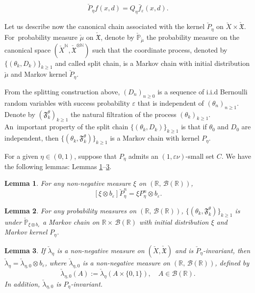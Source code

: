 \documentclass[11pt]{elsarticle}
\newtheorem{lemma}{Lemma}[section]
\def\geq{\geqslant}
\def\P{\mathbb{P}}
\def\N{\mathbb{N}}
\def\R{\mathbb{R}}
\begin{document}
$$\check{P}_\eta f(x,d)=Q_\eta\bar{f}_\varepsilon(x,d).$$

Let us describe now the canonical chain associated with the kernel $\check{P}_\eta$ on $\check{X}\times\check{\mathfrak{X}}$. For~probability measure $\check{\mu}$ on $\check{\mathfrak{X}}$, denote by $\check{\P}_{\check{\mu}}$ the probability measure on the canonical space $\left(\check{X}^{\N},{\check{\mathfrak{X}}}^{\otimes\N}\right)$ such that the coordinate process, denoted by $\{(\theta_k,D_k)\}_{k\geq1}$ and called split chain, is a Markov chain with initial distribution $\check{\mu}$ and Markov kernel $\check{P}_\eta$.

From the splitting construction above, $(D_n)_{n\geq0}$ is a sequence of i.i.d Bernoulli random variables with success probability $\varepsilon$ that is independent of $(\theta_n)_{n\geq1}$. Denote by $\left(\mathfrak{F}_k^\theta\right)_{k\geq1}$ the natural filtration of the process $(\theta_k)_{k\geq1}$. An~important property of the split chain $\{(\theta_k,D_k)\}_{k\geq1}$ is that if $\theta_0$ and $D_0$ are independent, then $\{(\theta_k,\mathfrak{F}_k^\theta)\}_{k\geq1}$ is a Markov chain with kernel $P_{\eta}$.

For a given $\eta\in(0,1)$, suppose that $P_\eta$ admits an $(1,\varepsilon\nu)$-small set $C$.  We have the following lemmas: Lemmas \ref{lem11.1.1}--\ref{prop11.1.3}.

\begin{lemma}\label{lem11.1.1}
	For any non-negative measure $\xi$ on $(\R,\,\mathcal{B}(\R))$,
	$$[\xi\otimes b_{\varepsilon}]\check{P}_{\eta}^n=\xi P_{\eta}^n\otimes b_\varepsilon.$$
\end{lemma} 

\begin{lemma}\label{prop11.1.2}
	For any probability measures on $(\R,\,\mathcal{B}(\R))$, $\{(\theta_k,\mathfrak{F}_k^\theta)\}_{k\geq1}$ is under $\check{\P}_{\xi\otimes b_\varepsilon}$ a Markov chain on $\R\times\,\mathcal{B}(\R)$ with initial distribution $\xi$ and Markov kernel $P_\eta$.
\end{lemma}

\begin{lemma}\label{prop11.1.3}
	If $\check{\lambda}_\eta$ is a non-negative measure on $(\check{X},\check{\mathfrak{X}})$ and is $\check{P}_\eta$-invariant, then $\check{\lambda}_{\eta}=\check{\lambda}_{\eta,0}\otimes b_\varepsilon$, where $\check{\lambda}_{\eta,0}$ is a non-negative measure on $(\R,\,\mathcal{B}(\R))$, defined by
	$$\check{\lambda}_{\eta,0}(A):=\check{\lambda}_{\eta}(A\times\{0,1\}),\quad A\in \mathcal{B}(\R).$$
	In addition, $\check{\lambda}_{\eta,0}$ is $P_\eta$-invariant.
\end{lemma}
\end{document}

